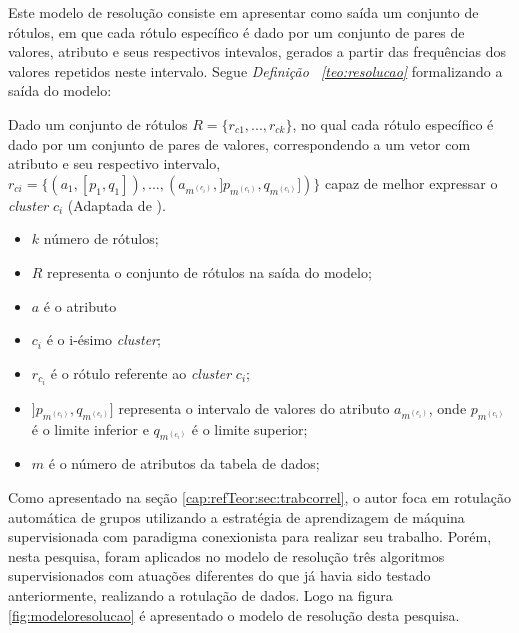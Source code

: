 Este modelo de resolução consiste em apresentar como saída um conjunto de rótulos, em que cada rótulo específico é dado por um conjunto de pares de valores, atributo e seus respectivos intevalos, gerados a partir das frequências dos valores repetidos neste intervalo. Segue \textit{Definição ~\ref{teo:resolucao}} formalizando a saída do modelo:
    \begin{teorema}
    Dado um conjunto de rótulos ${ R=\{ r_{c1},...,r_{ck} \} }$, no qual cada rótulo específico é dado por um conjunto de pares de valores, correspondendo a um vetor com atributo e seu respectivo intervalo, ${ r_{ci}=\{ (a_1,[p_1,q_1]),...,(a_{m^{(c_i)}}, ]p_{m^{(c_i)}},q_{m^{(c_i)}}]) \} }$ capaz de melhor expressar o \textit{cluster} ${c_i}$ (Adaptada de \cite{Lopes2016}).
        \begin{itemize}[noitemsep]
            \item ${k}$ número de rótulos;
            \item ${R}$ representa o conjunto de rótulos na saída do modelo;
            \item ${a}$ é o atributo
            \item ${c_i}$ é o i-ésimo \textit{cluster};
            \item ${r_{c_i}}$ é o rótulo referente ao \textit{cluster} ${c_i}$;
            \item ${]p_{m^{(c_i)}},q_{m^{(c_i)}}]}$ representa o intervalo de valores do atributo ${a_{m^{(c_i)}} }$, onde ${ p_{m^{(c_i)}} }$  é o limite inferior e ${ q_{m^{(c_i)}} }$ é o limite superior;
            \item ${m}$ é o número de atributos da tabela de dados;
        \end{itemize}
    \label{teo:resolucao}
    \end{teorema}

Como apresentado na seção \ref{cap:refTeor:sec:trabcorrel}, o autor \cite{Lopes2016} foca em rotulação automática de grupos utilizando a estratégia de aprendizagem de máquina supervisionada com paradigma conexionista para realizar seu trabalho. Porém, nesta pesquisa, foram aplicados no modelo de resolução três algoritmos supervisionados com atuações diferentes do que já havia sido testado anteriormente, realizando a rotulação de dados. Logo na figura \ref{fig:modeloresolucao} é apresentado o modelo de resolução desta pesquisa.


